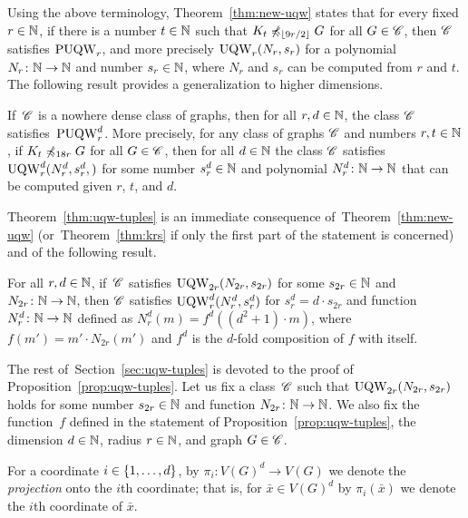 \medskip Using the above terminology, Theorem~\ref{thm:new-uqw} states
that for every fixed $r\in\mathbb{N}$, if there is a number $t\in\mathbb{N}$ such that
$K_t\not\preccurlyeq_{\lfloor 9r/2\rfloor} G$ for all $G\in \mathscr{C}$, then
$\mathscr{C}$ satisfies $\mathrm{PUQW}_r$, and more precisely $\mathrm{UQW}_r(N_r,s_r)$ for a
polynomial $N_r\colon\mathbb{N}\to\mathbb{N}$ and number $s_r\in \mathbb{N}$, where $N_r$ and
$s_r$ can be computed from $r$ and $t$.  The following result provides
a generalization to higher dimensions.

\begin{theorem}\label{thm:uqw-tuples}If\, $\mathscr{C}$
  is a nowhere dense class of graphs, then for all $r,d\in\mathbb{N}$, the
  class $\mathscr{C}$ satisfies~$\mathrm{PUQW}^d_r$.  More precisely, for any class
  of graphs $\mathscr{C}$ and numbers $r,t\in\mathbb{N}$, if $K_t\not\preccurlyeq_{18r} G$
  for all $G\in \mathscr{C}$, then for all $d\in \mathbb{N}$ the class $\mathscr{C}$
  satisfies $\mathrm{UQW}^d_{r}(N^d_r,s^d_r,)$ for some number $s^d_r\in \mathbb{N}$
  and polynomial $N^d_r\colon \mathbb{N}\to\mathbb{N}$ that can be computed given $r$,
  $t$, and $d$.
\end{theorem}


Theorem~\ref{thm:uqw-tuples} is an immediate consequence
of~Theorem~\ref{thm:new-uqw} (or~Theorem~\ref{thm:krs} if only the
first part of the statement is concerned) and of the following result.

\begin{proposition}\label{prop:uqw-tuples}
  For all $r,d\in\mathbb{N}$, if\, $\mathscr{C}$ satisfies $\mathrm{UQW}_{2r}(N_{2r},s_{2r})$
  for some $s_{2r}\in\mathbb{N}$ and \mbox{$N_{2r}\colon\mathbb{N}\to \mathbb{N}$}, then
  $\mathscr{C}$ satisfies $\mathrm{UQW}^d_r(N^d_r,s^d_r)$ for $s^d_r=d\cdot s_{2r}$
  and function $N^d_r\colon \mathbb{N}\to \mathbb{N}$ defined as
  $N^d_r(m)=f^d((d^2+1)\cdot m)$, where $f(m')=m'\cdot N_{2r}(m')$ and
  $f^d$ is the $d$-fold composition of $f$ with itself.
\end{proposition}


The rest of~Section~\ref{sec:uqw-tuples} is devoted to the proof of
Proposition~\ref{prop:uqw-tuples}.  Let us fix a class\, $\mathscr{C}$ such
that $\mathrm{UQW}_{2r}(N_{2r},s_{2r})$ holds for some number $s_{2r}\in \mathbb{N}$
and function $N_{2r}\colon \mathbb{N}\to \mathbb{N}$.  We also fix the function~$f$
defined in the statement of Proposition~\ref{prop:uqw-tuples}, the
dimension $d\in \mathbb{N}$, radius $r\in \mathbb{N}$, and graph $G\in \mathscr{C}$.

For a coordinate $i\in\{1,\ldots,d\}$, by
$\pi_i\colon V(G)^d\to V(G)$ we denote the {\em{projection}} onto the
$i$th coordinate; that is, for $\bar{x}\in V(G)^d$ by $\pi_i(\bar{x})$
we denote the $i$th coordinate of $\bar{x}$.
        
